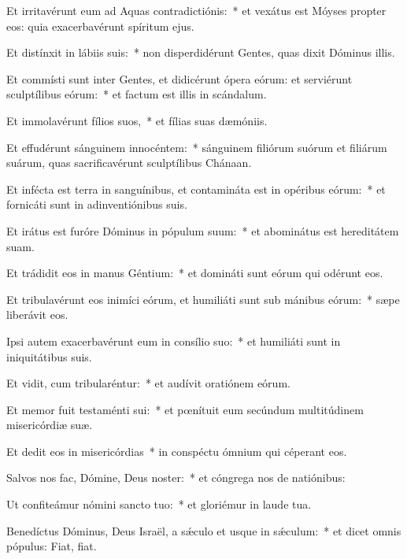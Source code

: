 
\item Et irritavérunt eum ad Aquas contradictiónis:~* et vexátus est Móyses propter eos: quia exacerbavérunt spíritum ejus.

\item Et distínxit in lábiis suis:~* non disperdidérunt Gentes, quas dixit Dóminus illis.

\item Et commísti sunt inter Gentes, et didicérunt ópera eórum: et serviérunt sculptílibus eórum:~* et factum est illis in scándalum.

\item Et immolavérunt fílios suos,~* et fílias suas dæmóniis.

\item Et effudérunt sánguinem innocéntem:~* sánguinem filiórum suórum et filiárum suárum, quas sacrificavérunt sculptílibus Chánaan.

\item Et infécta est terra in sanguínibus, et contamináta est in opéribus eórum:~* et fornicáti sunt in adinventiónibus suis.

\item Et irátus est furóre Dóminus in pópulum suum:~* et abominátus est hereditátem suam.

\item Et trádidit eos in manus Géntium:~* et domináti sunt eórum qui odérunt eos.

\item Et tribulavérunt eos inimíci eórum, et humiliáti sunt sub mánibus eórum:~* sæpe liberávit eos.

\item Ipsi autem exacerbavérunt eum in consílio suo:~* et humiliáti sunt in iniquitátibus suis.

\item Et vidit, cum tribularéntur:~* et audívit oratiónem eórum.

\item Et memor fuit testaménti sui:~* et pœnítuit eum secúndum multitúdinem misericórdiæ suæ.

\item Et dedit eos in misericórdias~* in conspéctu ómnium qui céperant eos.

\item Salvos nos fac, Dómine, Deus noster:~* et cóngrega nos de natiónibus:

\item Ut confiteámur nómini sancto tuo:~* et gloriémur in laude tua.

\item Benedíctus Dóminus, Deus Israël, a sǽculo et usque in sǽculum:~* et dicet omnis pópulus: Fiat, fiat.